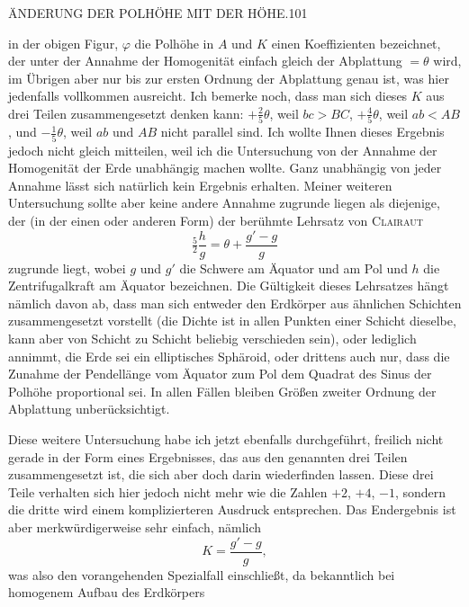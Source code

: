 \clearpage
\noindent\mbox{}\hfill ÄNDERUNG DER POLHÖHE MIT DER HÖHE.\hfill 101\par
\noindent in der obigen Figur, $\varphi$ die Polhöhe in $A$ und $K$ einen Koeffizienten bezeichnet, der unter der Annahme der Homogenität einfach gleich der Abplattung $=\theta$ wird, im Übrigen aber nur bis zur ersten Ordnung der Abplattung genau ist, was hier jedenfalls vollkommen ausreicht. Ich bemerke noch, dass man sich dieses $K$ aus drei Teilen zusammengesetzt denken kann: $+\tfrac25\theta$, weil $bc>BC$, $+\tfrac45\theta$, weil $ab<AB$, und $-\tfrac15\theta$, weil $ab$ und $AB$ nicht parallel sind. Ich wollte Ihnen dieses Ergebnis jedoch nicht gleich mitteilen, weil ich die Untersuchung von der Annahme der Homogenität der Erde unabhängig machen wollte. Ganz unabhängig von jeder Annahme lässt sich natürlich kein Ergebnis erhalten. Meiner weiteren Untersuchung sollte aber keine andere Annahme zugrunde liegen als diejenige, der (in der einen oder anderen Form) der berühmte Lehrsatz von \textsc{Clairaut}
\[
\tfrac52\frac hg=\theta+\frac{g'-g}g
\]
zugrunde liegt, wobei $g$ und $g'$ die Schwere am Äquator und am Pol und $h$ die Zentrifugalkraft am Äquator bezeichnen. Die Gültigkeit dieses Lehrsatzes hängt nämlich davon ab, dass man sich entweder den Erdkörper aus ähnlichen Schichten zusammengesetzt vorstellt (die Dichte ist in allen Punkten einer Schicht dieselbe, kann aber von Schicht zu Schicht beliebig verschieden sein), oder lediglich annimmt, die Erde sei ein elliptisches Sphäroid, oder drittens auch nur, dass die Zunahme der Pendellänge vom Äquator zum Pol dem Quadrat des Sinus der Polhöhe proportional sei. In allen Fällen bleiben Größen zweiter Ordnung der Abplattung unberücksichtigt.

Diese weitere Untersuchung habe ich jetzt ebenfalls durchgeführt, freilich nicht gerade in der Form eines Ergebnisses, das aus den genannten drei Teilen zusammengesetzt ist, die sich aber doch darin wiederfinden lassen. Diese drei Teile verhalten sich hier jedoch nicht mehr wie die Zahlen $+2$, $+4$, $-1$, sondern die dritte wird einem komplizierteren Ausdruck entsprechen. Das Endergebnis ist aber merkwürdigerweise sehr einfach, nämlich
\[
K=\frac{g'-g}g,
\]
was also den vorangehenden Spezialfall einschließt, da bekanntlich bei homogenem Aufbau des Erdkörpers
